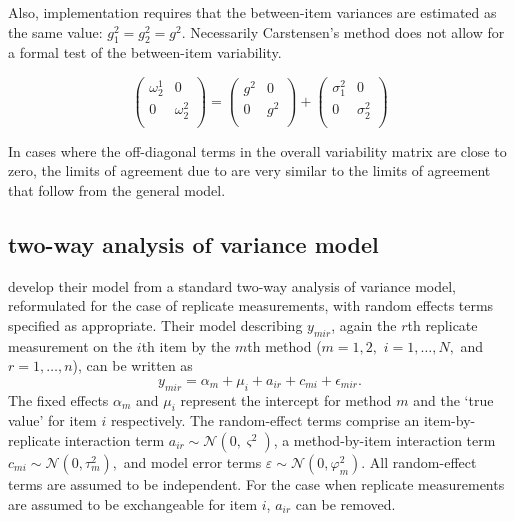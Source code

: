 \documentclass[12pt, a4paper]{report}
\theoremstyle{plain}
\theoremstyle{definition}
\theoremstyle{remark}
\begin{document}
Also, implementation requires that the between-item variances are
estimated as the same value: $g^2_1 = g^2_2 = g^2$. Necessarily
Carstensen's method does not allow for a formal test of the
between-item variability.

\[\left(\begin{array}{cc}
\omega^1_2  & 0 \\
0 & \omega^2_2 \\
\end{array}  \right)
=  \left(
\begin{array}{cc}
g^2  & 0 \\
0 & g^2 \\
\end{array} \right)+
\left(
\begin{array}{cc}
\sigma^2_1  & 0 \\
0 & \sigma^2_2 \\
\end{array}\right)
\]

In cases where the off-diagonal terms in the overall variability
matrix are close to zero, the limits of agreement due to
\citet{bxc2008} are very similar to the limits of agreement that
follow from the general model.


\subsection{two-way analysis of variance model}

\citet{BXC2008} develop their model from a standard two-way analysis of variance model, reformulated for the case of replicate measurements, with random effects terms specified as appropriate. 
Their model describing $y_{mir} $, again the $r$th replicate measurement on the $i$th item by the $m$th method ($m=1,2,$ $i=1,\ldots,N,$ and $r = 1,\ldots,n$), can be written as
\begin{equation}\label{BXC-model}
y_{mir}  = \alpha_{m} + \mu_{i} + a_{ir} + c_{mi} + \epsilon_{mir}.
\end{equation}
The fixed effects $\alpha_{m}$ and $\mu_{i}$  represent the intercept for method $m$ and the `true value' for item $i$ respectively. The random-effect terms comprise an item-by-replicate interaction term $a_{ir} \sim \mathcal{N}(0,\varsigma^{2})$, a method-by-item interaction term $c_{mi} \sim \mathcal{N}(0,\tau^{2}_{m}),$ and model error terms $\varepsilon \sim \mathcal{N}(0,\varphi^{2}_{m}).$ All random-effect terms are assumed to be independent.
For the case when replicate measurements are assumed to be exchangeable for item $i$, $a_{ir}$ can be removed.
\end{document}
